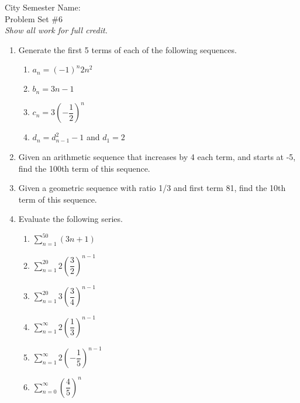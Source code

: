 \documentclass[12pt]{article}
\theoremstyle{plain}     %
\begin{document}
\large
City Semester  \hspace{8cm} Name:\makebox[6cm]{\hrulefill}
\\
Problem Set \#6\\
\normalsize 
\emph{Show all work for full credit.}\\
\begin{enumerate}
	\item Generate the first 5 terms of each of the following sequences.
		\begin{enumerate}
			\item $a_n= (-1)^n 2n^2$\\[2cm]
			\item $b_n= 3n-1$\\[2cm]
			\item $c_n= 3\left(-\dfrac{1}{2}\right)^n$\\[2cm]
			\item $d_n= d_{n-1}^2-1$ and $d_1=2$\\[2cm]
		\end{enumerate}
\item Given an arithmetic sequence that increases by 4 each term, and starts at -5, find the 100th term of this sequence.\\[3cm]
\item Given a geometric sequence with ratio 1/3 and first term 81, find the 10th term of this sequence.\\[3cm]
\item Evaluate the following series.
\begin{multicols}{2}
	\begin{enumerate}
		\item $\sum\limits_{n=1}^{50} (3n+1)$\\[5.5cm]
		\item $\sum\limits_{n=1}^{20}2\left(\dfrac{3}{2}\right)^{n-1}$\\[5cm]
		\item $\sum\limits_{n=1}^{20}3\left(\dfrac{3}{4}\right)^{n-1}$\\[5cm]
		\item $\sum\limits_{n=1}^\infty 2\left(\dfrac{1}{3}\right)^{n-1}$\\[5cm]
		\item $\sum\limits_{n=1}^\infty 2\left(-\dfrac{1}{5}\right)^{n-1}$\\[5cm]
		\item $\sum\limits_{n=0}^\infty \left(\dfrac{4}{5}\right)^n$\\[5cm]
		

\end{enumerate}
\end{multicols}
\end{enumerate}
\end{document}
